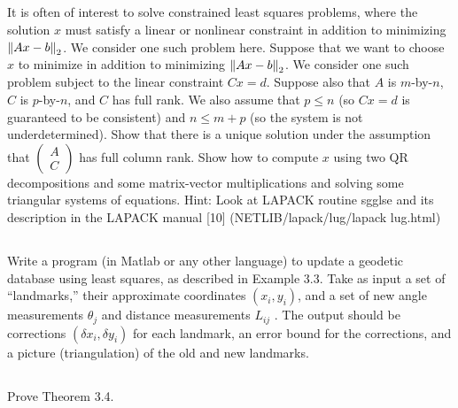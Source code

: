\documentclass[a4paper]{ctexart}
\newcommand{\pf}{\textbf{\color{pink}{proof:}}}
\begin{document}
\subsection{}
It is often of interest to solve constrained least
squares problems, where the solution $x$ must satisfy a linear or nonlinear constraint
 in addition to minimizing $\norm{Ax - b}_2$. We consider one such problem
here. Suppose that we want to choose $x$ to minimize  in addition to minimizing $\norm{Ax - b}_2$. We consider one such problem
subject to
the linear constraint $Cx = d$. Suppose also that $A$ is $m$-by-$n$, $C$ is $p$-by-$n$,
and $C$ has full rank. We also assume that $p \le n$ (so $Cx = d$ is guaranteed to be consistent)
and $n \le m + p$ (so the system is not underdetermined). Show
that there is a unique solution under the assumption that $\begin{pmatrix}
    A\\C
\end{pmatrix}$ has full column
rank. Show how to compute $x$ using two QR decompositions and some matrix-vector
multiplications and solving some triangular systems of equations. Hint:
Look at LAPACK routine sgglse and its description in the LAPACK manual
[10] (NETLIB/lapack/lug/lapack lug.html)

\pf

\subsection{}
Write a program (in Matlab or any
other language) to update a geodetic database using least squares, as described
in Example 3.3. Take as input a set of “landmarks,” their approximate coordinates $(x_i, y_i)$,
and a set of new angle measurements $\theta_j$ and distance measurements
$L_{ij}$ . The output should be corrections $(\delta x_i, \delta y_i)$ for each landmark, an
error bound for the corrections, and a picture (triangulation) of the old and
new landmarks.

\subsection{}
Prove Theorem 3.4.
\end{document}
